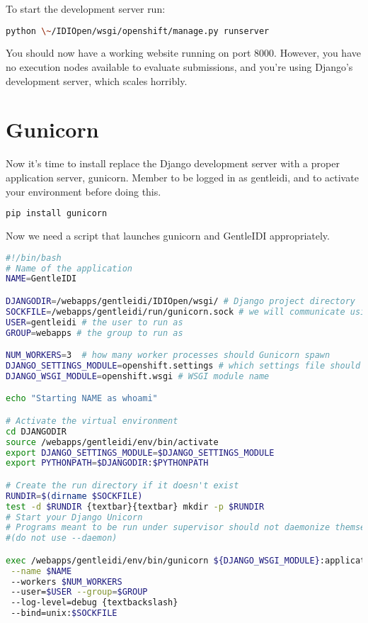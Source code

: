 To start the development server run:

\begin{lstlisting}[language=bash]
python \~/IDIOpen/wsgi/openshift/manage.py runserver
\end{lstlisting}

You should now have a working website running on port 8000. However, you
have no execution nodes available to evaluate submissions, and
you're using Django's development
server, which scales horribly.

\section{Gunicorn}
Now it's time to install replace the Django development
server with a proper application server, gunicorn. Member to be logged
in as gentleidi, and to activate your environment before doing this.

\begin{lstlisting}[language=bash]
pip install gunicorn
\end{lstlisting}
Now we need a script that launches gunicorn and GentleIDI appropriately.
\begin{lstlisting}[language=bash]
#!/bin/bash
# Name of the application
NAME=GentleIDI

DJANGODIR=/webapps/gentleidi/IDIOpen/wsgi/ # Django project directory
SOCKFILE=/webapps/gentleidi/run/gunicorn.sock # we will communicate using this unix socket
USER=gentleidi # the user to run as
GROUP=webapps # the group to run as

NUM_WORKERS=3  # how many worker processes should Gunicorn spawn
DJANGO_SETTINGS_MODULE=openshift.settings # which settings file should Django use
DJANGO_WSGI_MODULE=openshift.wsgi # WSGI module name

echo "Starting NAME as whoami"

# Activate the virtual environment
cd DJANGODIR
source /webapps/gentleidi/env/bin/activate
export DJANGO_SETTINGS_MODULE=$DJANGO_SETTINGS_MODULE
export PYTHONPATH=$DJANGODIR:$PYTHONPATH

# Create the run directory if it doesn't exist
RUNDIR=$(dirname $SOCKFILE)
test -d $RUNDIR {textbar}{textbar} mkdir -p $RUNDIR
# Start your Django Unicorn
# Programs meant to be run under supervisor should not daemonize themselves 
#(do not use --daemon)

exec /webapps/gentleidi/env/bin/gunicorn ${DJANGO_WSGI_MODULE}:application \
 --name $NAME 
 --workers $NUM_WORKERS 
 --user=$USER --group=$GROUP 
 --log-level=debug {textbackslash}
 --bind=unix:$SOCKFILE
\end{lstlisting}

